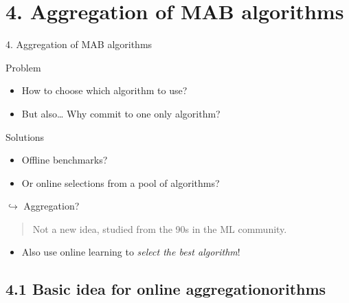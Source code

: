 \documentclass[12pt,english,ignorenonframetext,]{beamer}
\providecommand{\tightlist}{%
  \setlength{\itemsep}{0pt}\setlength{\parskip}{0pt}}
\begin{document}
\section{\hfill{}4. Aggregation of MAB algorithms\hfill{}}

\begin{frame}{%
\protect\hypertarget{aggregation-of-mab-algorithms}{%
4. Aggregation of MAB algorithms}}

\begin{block}{Problem}

\begin{itemize}
\tightlist
\item
  How to choose which algorithm to use?
\item
  But also\ldots{} Why commit to one only algorithm?
\end{itemize}

\end{block}

\begin{block}{Solutions}

\begin{itemize}
\tightlist
\item
  Offline benchmarks?
\item
  Or online selections from a pool of algorithms?
\end{itemize}

\end{block}

\begin{block}{\(\hookrightarrow\) Aggregation?}

\begin{quote}
Not a new idea, studied from the 90s in the ML community.
\end{quote}

\begin{itemize}
\tightlist
\item
  Also use online learning to \emph{select the best algorithm}!
\end{itemize}

\end{block}

\end{frame}


\subsection{\hfill{}4.1 Basic idea for online aggregationorithms\hfill{}}
\end{document}
